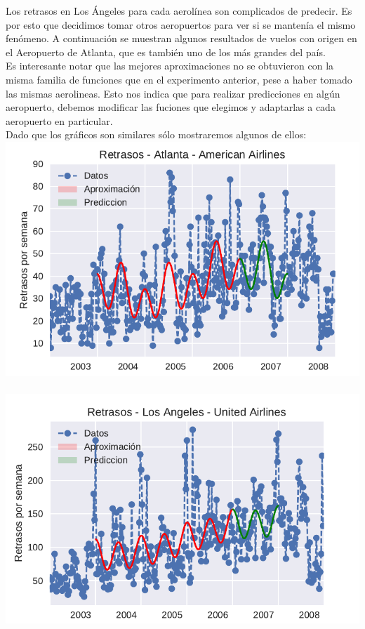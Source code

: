 Los retrasos en Los Ángeles para cada aerolínea son complicados de predecir. Es por esto que decidimos tomar otros aeropuertos para ver si se mantenía el mismo fenómeno. A continuación se muestran algunos resultados de vuelos con origen en el Aeropuerto de Atlanta, que es también uno de los más grandes del país. \\

Es interesante notar que las mejores aproximaciones no se obtuvieron con la misma familia de funciones que en el experimento anterior, pese a haber tomado las mismas aerolineas. Esto nos indica que para realizar predicciones en algún aeropuerto, debemos modificar las fuciones que elegimos y adaptarlas a cada aeropuerto en particular. \\

Dado que los gráficos son similares sólo mostraremos algunos de ellos: \\

{\centering
  \includegraphics[width=0.7\linewidth]{informe/imagenes/retrasosAmericanAirlinesATL.pdf}
}
$ $\newline
{\centering
  \includegraphics[width=0.7\linewidth]{informe/imagenes/retrasosUnitedAirlinesLA.pdf}
}
$ $\newline


